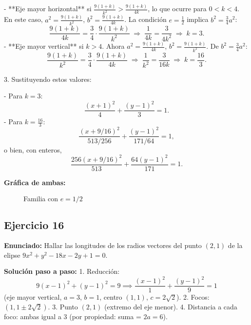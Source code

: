 \documentclass[12pt,a4paper]{article}
\begin{document}
   - **Eje mayor horizontal** si \(\displaystyle \frac{9(1+k)}{k^2} > \frac{9(1+k)}{4k}\), lo que ocurre para \(0<k<4\).  
     En este caso, \(a^2 = \frac{9(1+k)}{k^2}\), \(b^2 = \frac{9(1+k)}{4k}\).  
     La condición \(e = \frac{1}{2}\) implica \(b^2 = \frac{3}{4}a^2\):
     \[
     \frac{9(1+k)}{4k} = \frac{3}{4}\cdot\frac{9(1+k)}{k^2} \;\Longrightarrow\; \frac{1}{4k} = \frac{3}{4k^2} \;\Longrightarrow\; k = 3.
     \]
   - **Eje mayor vertical** si \(k>4\). Ahora \(a^2 = \frac{9(1+k)}{4k}\), \(b^2 = \frac{9(1+k)}{k^2}\).  
     De \(b^2 = \frac{3}{4}a^2\):
     \[
     \frac{9(1+k)}{k^2} = \frac{3}{4}\cdot\frac{9(1+k)}{4k} \;\Longrightarrow\; \frac{1}{k^2} = \frac{3}{16k} \;\Longrightarrow\; k = \frac{16}{3}.
     \]

3. Sustituyendo estos valores:

   - Para \(k = 3\):
     \[
     \frac{(x+1)^2}{4} + \frac{(y-1)^2}{3} = 1.
     \]
   - Para \(k = \frac{16}{3}\):
     \[
     \frac{(x+9/16)^2}{513/256} + \frac{(y-1)^2}{171/64} = 1,
     \]
     o bien, con enteros,
     \[
     \frac{256(x+9/16)^2}{513} + \frac{64(y-1)^2}{171} = 1.
     \]

\textbf{Gráfica de ambas:}
\begin{figure}[H]
\centering
{}
\caption{Familia con \(e=1/2\)}
\end{figure}
\newpage

\subsection{Ejercicio 16}
\textbf{Enunciado:} Hallar las longitudes de los radios vectores del punto \((2,1)\) de la elipse \(9x^2 + y^2 -18x -2y + 1 = 0\).

\textbf{Solución paso a paso:}
1. Reducción:
   \[
   9(x-1)^2 + (y-1)^2 = 9 \implies \frac{(x-1)^2}{1} + \frac{(y-1)^2}{9} = 1
   \]
   (eje mayor vertical, \(a=3\), \(b=1\), centro \((1,1)\), \(c=2\sqrt{2}\)).
2. Focos: \((1, 1 \pm 2\sqrt{2})\).
3. Punto \((2,1)\) (extremo del eje menor).
4. Distancia a cada foco: ambas igual a 3 (por propiedad: suma = \(2a = 6\)).
\end{document}
